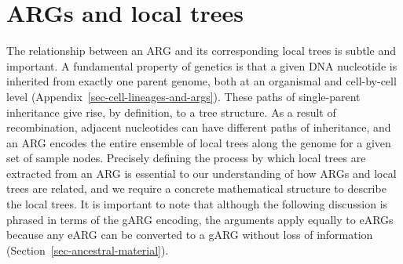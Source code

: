\documentclass[9pt,twocolumn,twoside]{gsajnl}
\begin{document}
\section{ARGs and local trees}
\label{sec-ARG-and-local-trees}
The relationship between an ARG and its corresponding
local trees is subtle and important.
A fundamental property of genetics is that a
given DNA nucleotide is inherited from exactly one parent genome,
both at an organismal and cell-by-cell level
(Appendix~\ref{sec-cell-lineages-and-args}).
These paths of single-parent inheritance give rise,
by definition, to a tree structure.
As a result of recombination, adjacent nucleotides can have
different paths of inheritance, and
an ARG encodes the entire ensemble of local trees along the
genome for a given set of sample nodes.
Precisely defining the process by which local trees are extracted
from an ARG is essential to our understanding of how ARGs and local trees
are related, and we require a concrete mathematical structure
to describe the local trees. It is important to note that
although the following discussion is phrased in terms of the
gARG encoding,  the arguments apply equally to eARGs
because any eARG can be converted to a
gARG without loss of information (Section~\ref{sec-ancestral-material}).
\end{document}

